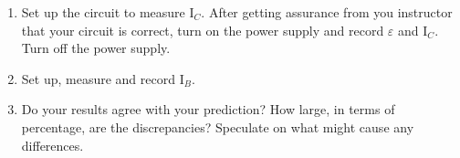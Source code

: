 \begin{enumerate}
\item Set up the circuit to measure I\( _{C} \). After getting assurance
from you instructor that your circuit is correct, turn on the power
supply and record \( \varepsilon  \) and I\( _{C} \). Turn off the
power supply.\vspace{15mm}

\item Set up, measure and record I\( _{B} \).\vspace{15mm}

\item Do your results agree with your prediction? How large, in terms of
percentage, are the discrepancies? Speculate on what might cause any
differences.\vspace{15mm}
\end{enumerate}


